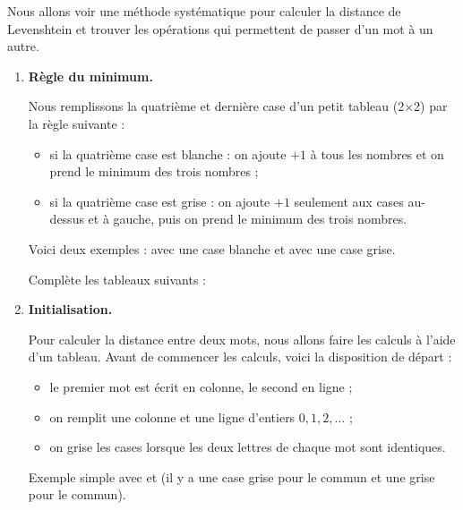 \documentclass[class=report,crop=false, 12pt]{standalone}
\begin{document}
\begin{activite}

Nous allons voir une méthode systématique pour calculer la distance de Levenshtein et trouver les opérations qui permettent de passer d'un mot à un autre.


\begin{enumerate}

\item \textbf{Règle du minimum.}

Nous remplissons la quatrième et dernière case d'un petit tableau (2$\times$2) par la règle suivante :
\begin{itemize}
  \item si la quatrième case est blanche : on ajoute $+1$ à tous les nombres et on prend le minimum des trois nombres ;
  
  \item si la quatrième case est grise : on ajoute $+1$ seulement aux cases au-dessus et à gauche, puis on prend le minimum des trois nombres.
\end{itemize}


Voici deux exemples : avec une case blanche et avec une case grise.



Complète les tableaux suivants :



\item \textbf{Initialisation.}

Pour calculer la distance entre deux mots, nous allons faire les calculs à l'aide d'un tableau. Avant de commencer les calculs, voici la disposition de départ :

\begin{itemize}
  \item le premier mot est écrit en colonne, le second en ligne ;
  \item on remplit une colonne et une ligne d'entiers $0,1,2,\ldots$ ;
  \item on grise les cases lorsque les deux lettres de chaque mot sont identiques.
\end{itemize}

Exemple simple avec  et  (il y a une case grise pour le  commun et une grise pour le  commun).



\end{enumerate}
\end{activite}
\end{document}
